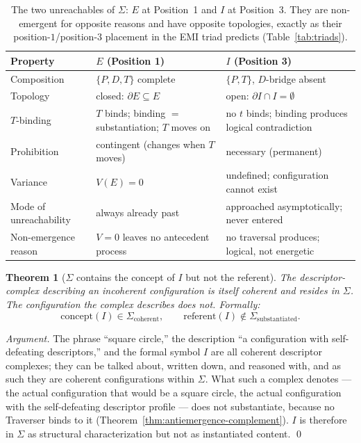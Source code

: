 \documentclass[11pt,a4paper]{article}
\newtheorem{theorem}{Theorem}[section]
\theoremstyle{definition}
\theoremstyle{remark}
\begin{document}
\begin{table}[h]
\centering
\begin{tabular}{@{}l >{\raggedright\arraybackslash}p{} >{\raggedright\arraybackslash}p{}@{}}
\toprule
Property & $E$ (Position 1) & $I$ (Position 3) \\
\midrule
Composition & $\{P,D,T\}$ complete & $\{P,T\}$, $D$-bridge absent\\
Topology & closed: $\partial E \subseteq E$ & open: $\partial I \cap I = \emptyset$\\
$T$-binding & $T$ binds; binding $=$ substantiation; $T$ moves on & no $t$ binds; binding produces logical contradiction\\
Prohibition & contingent (changes when $T$ moves) & necessary (permanent)\\
Variance & $V(E) = 0$ & undefined; configuration cannot exist\\
Mode of unreachability & always already past & approached asymptotically; never entered\\
Non-emergence reason & $V=0$ leaves no antecedent process & no traversal produces; logical, not energetic\\
\bottomrule
\end{tabular}
\caption{The two unreachables of $\Sigma$: $E$ at Position~1 and $I$ at Position~3. They are non-emergent for opposite reasons and have opposite topologies, exactly as their position-$1$/position-$3$ placement in the EMI triad predicts (Table~\ref{tab:triads}).}
\label{tab:two-unreachables}
\end{table}

\begin{theorem}[$\Sigma$ contains the concept of $I$ but not the referent]\label{thm:I-concept-not-referent}
The descriptor-complex describing an incoherent configuration is itself coherent and resides in $\Sigma$. The configuration the complex describes does not. Formally:
\[
\mathrm{concept}(I) \in \Sigma_{\mathrm{coherent}}, \qquad \mathrm{referent}(I) \notin \Sigma_{\mathrm{substantiated}}.
\]
\end{theorem}

\begin{proof}[Argument]
The phrase ``square circle,'' the description ``a configuration with self-defeating descriptors,'' and the formal symbol $I$ are all coherent descriptor complexes; they can be talked about, written down, and reasoned with, and as such they are coherent configurations within $\Sigma$. What such a complex denotes --- the actual configuration that would be a square circle, the actual configuration with the self-defeating descriptor profile --- does not substantiate, because no Traverser binds to it (Theorem~\ref{thm:antiemergence-complement}). $I$ is therefore in $\Sigma$ as structural characterization but not as instantiated content. \qed
\end{proof}
\end{document}
